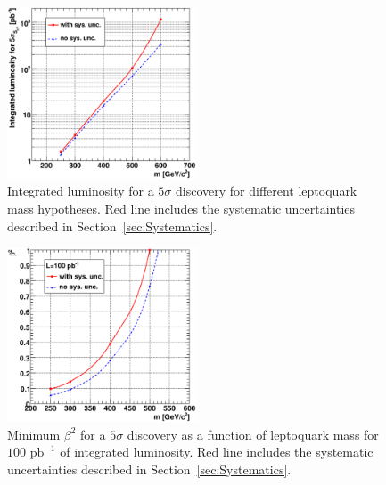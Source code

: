 \begin{figure}[h!]
 \centering
 \includegraphics[width=0.5\textwidth]{plots/cmsPotential/L5sigma_vs_m_log.eps}
 \caption{Integrated luminosity
for a $5\sigma$ discovery for different leptoquark mass hypotheses. Red line includes the systematic uncertainties described in 
Section~\ref{sec:Systematics}.\label{fig:discovery}}
\end{figure}
\begin{figure}[h!]
 \centering
  \includegraphics[width=0.5\textwidth]{plots/cmsPotential/beta2_vs_m.eps}
 \caption{Minimum $\beta^2$ for
a $5\sigma$ discovery as a function of leptoquark mass for $100\text{ pb}^{-1}$ of integrated luminosity. Red line includes the systematic
uncertainties described in Section~\ref{sec:Systematics}.\label{fig:discovery_beta}}
\end{figure}


